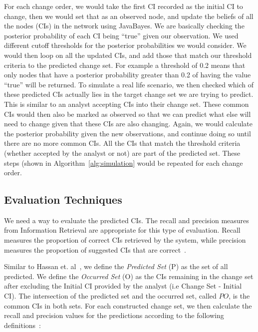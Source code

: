\documentclass[10pt,twocolumn,letterpaper]{article}
\begin{document}
For each change order, we would take the first CI recorded as the initial CI to change, then we would set that as an observed node, and update
the beliefs of all the nodes (CIs) in the network using JavaBayes. We are basically checking the posterior probability of each CI being ``true'' given our
observation. We used different
cutoff thresholds for the posterior probabilities we would consider. We would then loop on all the updated CIs, and add those that match our threshold criteria
to
the predicted change set. For example a threshold of 0.2 means that only nodes that have a posterior probability greater than 0.2 of having the value ``true''
will be returned. To simulate a real life scenario, we then checked which of these predicted CIs actually lies in the target change set we are trying to
predict. This is similar to an analyst accepting CIs into their change set. These common CIs would then also be marked as observed so that we can predict
what else will need to change given that these CIs are also changing. Again, we would calculate the posterior probability given the new observations, and
continue doing
so until there are no more common CIs. All the CIs that match the threshold criteria (whether accepted by the analyst or not) are part of the predicted
set. These steps (shown in Algorithm~\ref{alg:simulation} would be repeated for each change order.

\subsection{Evaluation Techniques}

We need a way to evaluate the predicted CIs. The recall and precision measures from Information Retrieval are appropriate for this type of evaluation.
Recall measures the proportion of correct CIs retrieved by the system, while precision measures the proportion of suggested CIs that are correct~\cite{van79}.

Similar to Hassan et. al~\cite{hassan2004predicting}, we define the \textit{Predicted Set} (P) as the set of all predicted. We define the \textit{Occurred
Set} (O) as the CIs remaining in the change set after excluding the Initial CI
provided by the analyst (i.e Change Set - Initial CI). The intersection of the predicted set and the occurred set, called $PO$, is the common CIs in both sets.
For each constructed change set, we then calculate the recall and precision values for the predictions according to the following
definitions~\cite{hassan2004predicting}:
\end{document}
